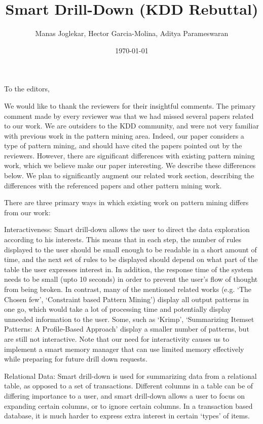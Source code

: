 \documentclass{article}
\date{\today}
\begin{document}
\title{Smart Drill-Down (KDD Rebuttal)}
\author{Manas Joglekar, Hector Garcia-Molina, Aditya Parameswaran}
\maketitle
To the editors,

We would like to thank the reviewers for their insightful comments. The primary comment made by every reviewer was that we had missed several papers related to our work. We are outsiders to the KDD community, and were not very familiar with previous work in the pattern mining area. Indeed, our paper considers a type of pattern mining, and should have cited the papers pointed out by the reviewers. However, there are significant differences with existing pattern mining work, which we believe make our paper interesting. We describe these differences below. We plan to significantly augment our related work section, describing the differences with the referenced papers and other pattern mining work.

There are three primary ways in which existing work on pattern mining differs from our work:

Interactiveness: Smart drill-down allows the user to direct the data exploration according to his interests. This means that in each step, the number of rules displayed to the user should be small enough to be readable in a short amount of time, and the next set of rules to be displayed should depend on what part of the table the user expresses interest in. In addition, the response time of the system needs to be small (upto 10 seconds) in order to prevent the user's flow of thought from being broken. In contrast, many of the mentioned related works (e.g. `The Chosen few', `Constraint based Pattern Mining') display all output patterns in one go, which would take a lot of processing time and potentially display unneeded information to the user. Some, such as `Krimp', `Summarizing Itemset Patterns: A Profile-Based Approach' display a smaller number of patterns, but are still not interactive. Note that our need for interactivity causes us to implement a smart memory manager that can use limited memory effectively while preparing for future drill down requests.

Relational Data: Smart drill-down is used for summarizing data from a relational table, as opposed to a set of transactions. Different columns in a table can be of differing importance to a user, and smart drill-down allows a user to focus on expanding certain columns, or to ignore certain columns. In a transaction based database, it is much harder to express extra interest in certain `types' of items.  
\end{document}
